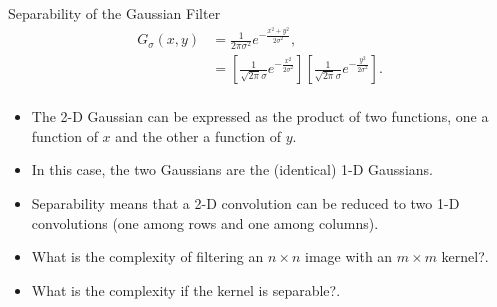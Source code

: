 \begin{frame}{Separability of the Gaussian Filter}
    \begin{equation*}
        \begin{split}
        G_\sigma(x,y) &= \frac{1}{2\pi\sigma^2}e^{-\frac{x^2+y^2}{2\sigma^2}},\\
        &= \left[\frac{1}{\sqrt{2\pi}\sigma}e^{-\frac{x^2}{2\sigma^2}}\right]\left[\frac{1}{\sqrt{2\pi}\sigma}e^{-\frac{y^2}{2\sigma^2}}\right].\\
        \end{split}
    \end{equation*}
    \begin{itemize}
        \item The 2-D Gaussian can be expressed as the product of two functions, one a function of $x$ and the other a function of $y$.
        \item In this case, the two Gaussians are the (identical) 1-D Gaussians.
        \pause
        \item Separability means that a 2-D convolution can be reduced to two 1-D convolutions (one among rows and one among columns).
        \item What is the complexity of filtering an $n\times n$ image with an $m\times m$ kernel?\pause {}.
        \item What is the complexity if the kernel is separable?\pause {}.
    \end{itemize}
\end{frame}

